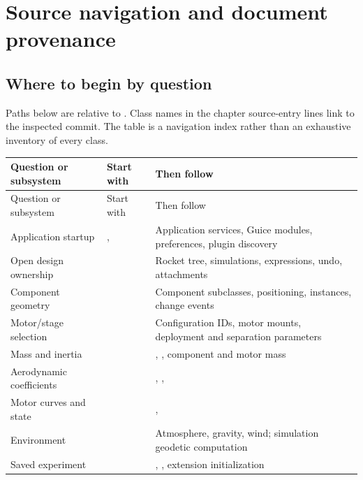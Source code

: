 \chapter{Source navigation and document provenance}\label{app:source}
\section{Where to begin by question}
Paths below are relative to . Class names in the chapter source-entry lines link to the inspected commit. The table is a navigation index rather than an exhaustive inventory of every class.

\begin{longtable}{@{}L{3.4cm}L{7.0cm}L{5.4cm}@{}}
\toprule Question or subsystem & Start with & Then follow\\\midrule\endfirsthead
\toprule Question or subsystem & Start with & Then follow\\\midrule\endhead
Application startup & ,  & Application services, Guice modules, preferences, plugin discovery\\
Open design ownership &  & Rocket tree, simulations, expressions, undo, attachments\\
Component geometry &  & Component subclasses, positioning, instances, change events\\
Motor/stage selection &  & Configuration IDs, motor mounts, deployment and separation parameters\\
Mass and inertia &  & , , component and motor mass\\
Aerodynamic coefficients &  & , , \\
Motor curves and state &  & , \\
Environment &  & Atmosphere, gravity, wind; simulation geodetic computation\\
Saved experiment &  & , , extension initialization\\

\end{longtable}
